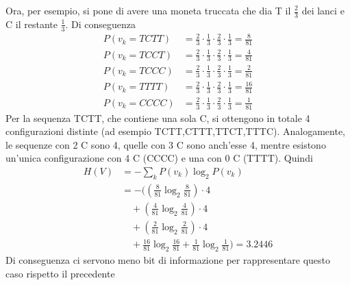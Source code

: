 Ora, per esempio, si pone di avere una moneta truccata che dia T il $\frac{2}{3}$ dei lanci e C il restante $\frac{1}{3}$.
Di conseguenza
\begin{align}
    P(v_k=TCTT)&=\frac{2}{3}\cdot\frac{1}{3}\cdot\frac{2}{3}\cdot\frac{1}{3}= \frac{8}{81}\\
    P(v_k=TCCT)&=\frac{2}{3}\cdot\frac{1}{3}\cdot\frac{2}{3}\cdot\frac{1}{3}= \frac{4}{81}\\
    P(v_k=TCCC)&=\frac{2}{3}\cdot\frac{1}{3}\cdot\frac{2}{3}\cdot\frac{1}{3}= \frac{2}{81}\\
    P(v_k=TTTT)&=\frac{2}{3}\cdot\frac{1}{3}\cdot\frac{2}{3}\cdot\frac{1}{3}= \frac{16}{81}\\
    P(v_k=CCCC)&=\frac{2}{3}\cdot\frac{1}{3}\cdot\frac{2}{3}\cdot\frac{1}{3}= \frac{1}{81}
\end{align}
Per la sequenza TCTT, che contiene una sola C, si ottengono in totale 4 configurazioni distinte 
(ad esempio TCTT,CTTT,TTCT,TTTC). Analogamente, le sequenze con 2 C sono 4, quelle con 3 C sono anch'esse 4, 
mentre esistono un'unica configurazione con 4 C (CCCC) e una con 0 C (TTTT).
Quindi
\begin{align*}
    H(V)&=-\sum_k P(v_k)\log_2P(v_k)\\
    &=-\Bigg(\left(\frac{8}{81}\log_2\frac{8}{81}\right)\cdot4\\
    &\quad +\left(\frac{4}{81}\log_2\frac{4}{81}\right)\cdot4\\
    &\quad +\left(\frac{2}{81}\log_2\frac{2}{81}\right)\cdot4\\
    &\quad +\frac{16}{81}\log_2\frac{16}{81}+\frac{1}{81}\log_2\frac{1}{81}\Bigg)=3.2446
\end{align*}
Di conseguenza ci servono meno bit di informazione per rappresentare questo caso rispetto il precedente
